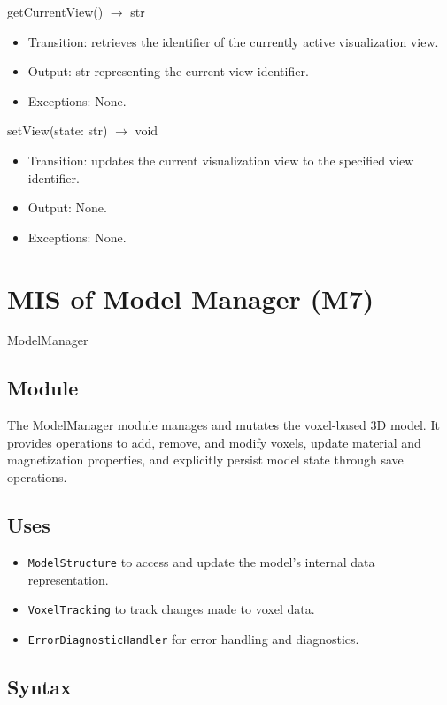 \documentclass[12pt, titlepage]{article}
\begin{document}
getCurrentView() $\rightarrow$ str
\begin{itemize}
  \item Transition: retrieves the identifier of the currently active visualization view.
  \item Output: str representing the current view identifier.
  \item Exceptions: None.
\end{itemize}

setView(state: str) $\rightarrow$ void
\begin{itemize}
  \item Transition: updates the current visualization view to the specified view identifier.
  \item Output: None.
  \item Exceptions: None.
\end{itemize}


\section{MIS of Model Manager (M7)}\label{Module9}

ModelManager

\subsection{Module}
The ModelManager module manages and mutates the voxel-based 3D model. It provides operations to add, remove, and modify voxels, update material and magnetization properties, and explicitly persist model state through save operations.

\subsection{Uses}
\begin{itemize}
  \item \texttt{ModelStructure} to access and update the model’s internal data representation.
  \item \texttt{VoxelTracking} to track changes made to voxel data.

  \item \texttt{ErrorDiagnosticHandler} for error handling and diagnostics.
\end{itemize}

\subsection{Syntax}
\end{document}
